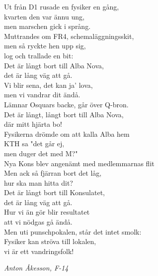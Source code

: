 \documentclass[a6paper,10pt]{article}
\begin{document}
\setlength{\oddsidemargin}{-0.37in}
\noindent
\begin{center}
\end{center}
Ut från D1 rusade en fysiker en gång, \\
kvarten den var ännu ung, \\ men marschen gick i språng. \\
Muttrandes om FR4, schemaläggningsskit, \\
men så ryckte hen upp sig,  \\log och trallade en bit:
\vspace{5pt} \\
Det är långt bort till Alba Nova, \\
det är lång väg att gå. \\
Vi blir sena, det kan ja’ lova, \\ 
men vi vandrar dit ändå. \\
Lämnar Osquars backe, går över Q-bron. \\
Det är långt, långt bort till Alba Nova, \\
där mitt hjärta bo!
\vspace{5pt} \\
Fysikerna drömde om att kalla Alba hem \\
KTH sa "det går ej, \\ men duger det med M?" \\
Nya Kons blev angenämt med medlemmarnas flit \\
Men ack så fjärran bort det låg, \\ hur ska man hitta dit?
\vspace{5pt} \\
Det är långt bort till Konsulatet, \\
det är lång väg att gå. \\
Hur vi än gör blir resultatet \\
att vi nödgas gå ändå. \\
Men uti punschpokalen, står det intet smolk: \\
Fysiker kan ströva till lokalen, \\
vi är ett vandringsfolk!
\begin{flushright}
\textit{Anton Åkesson, F-14}
\end{flushright}
\end{document}
